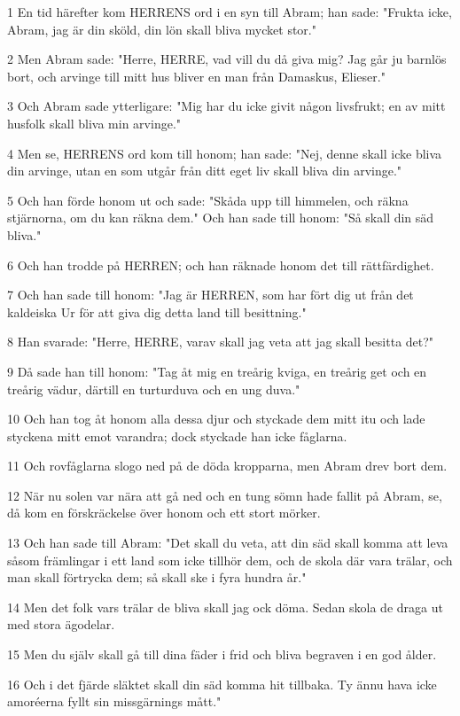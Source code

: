 \par 1 En tid härefter kom HERRENS ord i en syn till Abram; han sade: "Frukta icke, Abram, jag är din sköld, din lön skall bliva mycket stor."
\par 2 Men Abram sade: "Herre, HERRE, vad vill du då giva mig? Jag går ju barnlös bort, och arvinge till mitt hus bliver en man från Damaskus, Elieser."
\par 3 Och Abram sade ytterligare: "Mig har du icke givit någon livsfrukt; en av mitt husfolk skall bliva min arvinge."
\par 4 Men se, HERRENS ord kom till honom; han sade: "Nej, denne skall icke bliva din arvinge, utan en som utgår från ditt eget liv skall bliva din arvinge."
\par 5 Och han förde honom ut och sade: "Skåda upp till himmelen, och räkna stjärnorna, om du kan räkna dem." Och han sade till honom: "Så skall din säd bliva."
\par 6 Och han trodde på HERREN; och han räknade honom det till rättfärdighet.
\par 7 Och han sade till honom: "Jag är HERREN, som har fört dig ut från det kaldeiska Ur för att giva dig detta land till besittning."
\par 8 Han svarade: "Herre, HERRE, varav skall jag veta att jag skall besitta det?"
\par 9 Då sade han till honom: "Tag åt mig en treårig kviga, en treårig get och en treårig vädur, därtill en turturduva och en ung duva."
\par 10 Och han tog åt honom alla dessa djur och styckade dem mitt itu och lade styckena mitt emot varandra; dock styckade han icke fåglarna.
\par 11 Och rovfåglarna slogo ned på de döda kropparna, men Abram drev bort dem.
\par 12 När nu solen var nära att gå ned och en tung sömn hade fallit på Abram, se, då kom en förskräckelse över honom och ett stort mörker.
\par 13 Och han sade till Abram: "Det skall du veta, att din säd skall komma att leva såsom främlingar i ett land som icke tillhör dem, och de skola där vara trälar, och man skall förtrycka dem; så skall ske i fyra hundra år."
\par 14 Men det folk vars trälar de bliva skall jag ock döma. Sedan skola de draga ut med stora ägodelar.
\par 15 Men du själv skall gå till dina fäder i frid och bliva begraven i en god ålder.
\par 16 Och i det fjärde släktet skall din säd komma hit tillbaka. Ty ännu hava icke amoréerna fyllt sin missgärnings mått."
